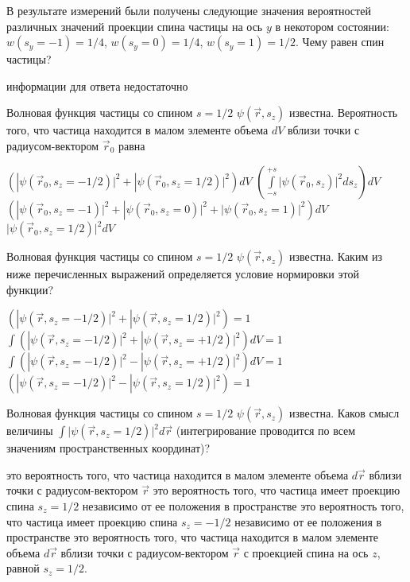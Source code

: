 \documentclass[11pt,a4paper]{exam}
\begin{document}
\begin{questions}
\question В результате измерений были получены следующие значения вероятностей различных значений проекции спина частицы на ось $y$ в некотором состоянии: $w({s_y} =  - 1) = 1/4$, $w({s_y} = 0) = 1/4$, $w({s_y} = 1) = 1/2$. Чему равен спин частицы?
\begin{choices}
\choice информации для ответа недостаточно
\end{choices}

\question Волновая функция частицы со спином $s = 1/2$ $\psi (\vec r,{s_z})$ известна. Вероятность того, что частица находится в малом элементе объема $dV$ вблизи точки с радиусом-вектором ${\vec r_0}$ равна
\begin{choices}
\choice $\left( {|\psi ({{\vec r}_0},{s_z} =  - 1/2){|^2} + |\psi ({{\vec r}_0},{s_z} = 1/2){|^2}} \right)dV$          
\choice $\left( {\int\limits_{ - s}^{ + s} {|\psi ({{\vec r}_0},{s_z}){|^2}d{s_z}} } \right)dV$
\choice $\left( {|\psi ({{\vec r}_0},{s_z} =  - 1){|^2} + |\psi ({{\vec r}_0},{s_z} = 0){|^2} + |\psi ({{\vec r}_0},{s_z} = 1){|^2}} \right)dV$      
\choice $|\psi ({\vec r_0},{s_z} = 1/2){|^2}dV$
\end{choices}

\question Волновая функция частицы со спином $s = 1/2$ $\psi (\vec r,{s_z})$ известна. Каким из ниже перечисленных выражений определяется условие нормировки этой функции?
\begin{choices}
\choice $\left( {|\psi (\vec r,{s_z} =  - 1/2){|^2} + |\psi (\vec r,{s_z} = 1/2){|^2}} \right) = 1$
\choice $\int {\left( {|\psi (\vec r,{s_z} =  - 1/2){|^2} + |\psi (\vec r,{s_z} =  + 1/2){|^2}} \right)dV = 1} $
\choice $\int {\left( {|\psi (\vec r,{s_z} =  - 1/2){|^2} - |\psi (\vec r,{s_z} =  + 1/2){|^2}} \right)dV = 1} $
\choice $\left( {|\psi (\vec r,{s_z} =  - 1/2){|^2} - |\psi (\vec r,{s_z} = 1/2){|^2}} \right) = 1$ 
\end{choices}

\question Волновая функция частицы со спином $s = 1/2$ $\psi (\vec r,{s_z})$ известна. Каков смысл величины $\int {|\psi (\vec r,{s_z} = 1/2){|^2}d\vec r} $ (интегрирование проводится по всем значениям пространственных координат)?
\begin{choices}
\choice это вероятность того, что частица находится в малом элементе объема $d\vec r$ вблизи точки с радиусом-вектором $\vec r$
\choice это вероятность того, что частица имеет проекцию спина ${s_z} = 1/2$ независимо от ее положения в пространстве
\choice это вероятность того, что частица имеет проекцию спина ${s_z} =  - 1/2$ независимо от ее положения в пространстве
\choice это вероятность того, что частица находится в малом элементе объема $d\vec r$ вблизи точки с радиусом-вектором $\vec r$ с проекцией спина на ось $z$, равной ${s_z} = 1/2$.
\end{choices}


\end{questions}
\end{document}
